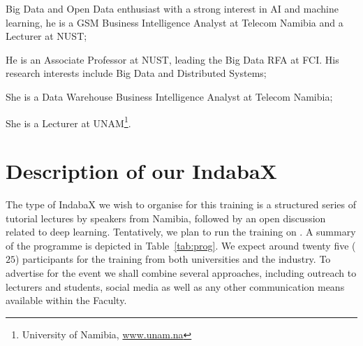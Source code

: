 \documentclass[10pt]{article}
\begin{document}
\begin{description}[align=left]
    \item[Lameck M. Amugongo] Big Data and Open Data enthusiast with a strong interest in AI and machine learning, he is a GSM Business Intelligence Analyst at
    Telecom Namibia and a Lecturer at NUST;
    \item[Jos\'{e} G. Quenum] He is an Associate Professor at NUST, leading the Big Data RFA at FCI. His research interests include Big Data and Distributed
    Systems;
    \item[Emilia N. Shikeenga] She is a Data Warehouse Business Intelligence Analyst at Telecom Namibia;
    \item[Annastasia Shipepe] She is a Lecturer at UNAM\footnote{University of Namibia, \url{www.unam.na}}.
\end{description}

\section{Description of our IndabaX}
\label{sec:indaba-format}


The type of IndabaX we wish to organise for this training is a structured series of tutorial lectures by speakers from Namibia, followed by an open discussion
related to deep learning. Tentatively, we plan to run the training on . A summary of the programme is depicted in Table~\ref{tab:prog}.
We expect around twenty five ($25$) participants for the training from both universities and the industry. To advertise for the event we shall combine several
 approaches, including outreach to lecturers and students, social media as well as any other communication means available within the Faculty.
\end{document}
